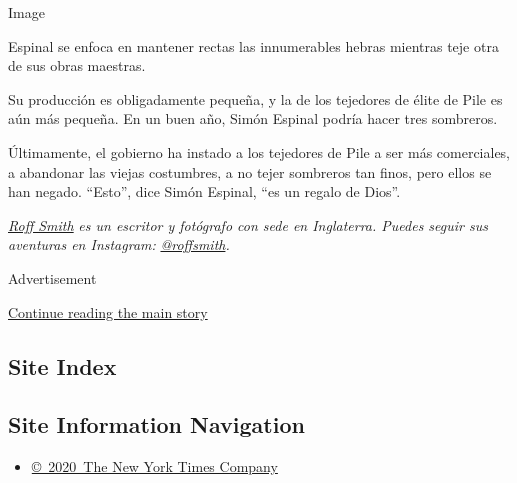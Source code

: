 Image

Espinal se enfoca en mantener rectas las innumerables hebras mientras
teje otra de sus obras maestras.

Su producción es obligadamente pequeña, y la de los tejedores de élite
de Pile es aún más pequeña. En un buen año, Simón Espinal podría hacer
tres sombreros.

Últimamente, el gobierno ha instado a los tejedores de Pile a ser más
comerciales, a abandonar las viejas costumbres, a no tejer sombreros tan
finos, pero ellos se han negado. ``Esto'', dice Simón Espinal, ``es un
regalo de Dios''.

\href{http://www.roffsmithphotography.com/}{\emph{Roff Smith}} \emph{es
un escritor y fotógrafo con sede en Inglaterra. Puedes seguir sus
aventuras en Instagram:}
\href{https://www.instagram.com/roffsmith/}{\emph{@roffsmith}}\emph{.}

Advertisement

\protect\hyperlink{after-bottom}{Continue reading the main story}

\hypertarget{site-index}{%
\subsection{Site Index}\label{site-index}}

\hypertarget{site-information-navigation}{%
\subsection{Site Information
Navigation}\label{site-information-navigation}}

\begin{itemize}
\tightlist
\item
  \href{https://help.nytimes3xbfgragh.onion/hc/en-us/articles/115014792127-Copyright-notice}{©~2020~The
  New York Times Company}
\end{itemize}


